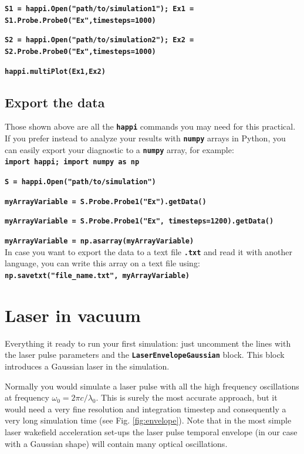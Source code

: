 \documentclass{article}
\newcommand{\commandline}[1]{\texttt{\textbf{#1}}}
\begin{document}
\commandline{S1 = happi.Open("path/to/simulation1"); Ex1 = S1.Probe.Probe0("Ex",timesteps=1000)}

\commandline{S2 = happi.Open("path/to/simulation2"); Ex2 = S2.Probe.Probe0("Ex",timesteps=1000)}

\commandline{happi.multiPlot(Ex1,Ex2)}

\subsection*{Export the data}
Those shown above are all the \commandline{happi} commands you may need for this practical. If you prefer instead to analyze your results with \commandline{numpy} arrays in Python, you can easily export your diagnostic to a \commandline{numpy} array, for example:\\

\commandline{import happi; import numpy as np}

\commandline{S =  happi.Open("path/to/simulation")}

\commandline{myArrayVariable = S.Probe.Probe1("Ex").getData()} 

\commandline{myArrayVariable = S.Probe.Probe1("Ex", timesteps=1200).getData()}

\commandline{myArrayVariable = np.asarray(myArrayVariable) }\\

In case you want to export the data to a text file \commandline{.txt} and read it with another language, you can write this array on a text file using:\\

\commandline{np.savetxt("file\_name.txt", myArrayVariable)}

\section{Laser in vacuum}
Everything it ready to run your first simulation: just uncomment the lines with the laser pulse parameters and the \commandline{LaserEnvelopeGaussian} block. This block introduces a Gaussian laser in the simulation.

Normally you would simulate a laser pulse with all the high frequency oscillations at frequency $\omega_0=2\pi c/\lambda_0$. This is surely the most accurate approach, but it would need a very fine resolution and integration timestep and consequently a very long simulation time (see Fig. \ref{fig:envelope}). Note that in the most simple laser wakefield acceleration set-ups the laser pulse temporal envelope (in our case with a Gaussian shape) will contain many optical oscillations.
\end{document}
